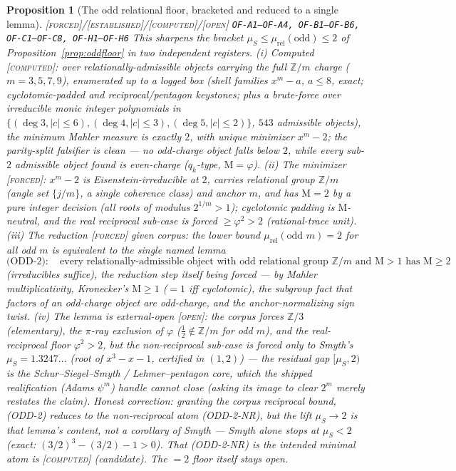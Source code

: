 \documentclass[11pt]{article}
\newcommand{\tagF}{\textcolor{cF}{\textsc{[forced]}}}
\newcommand{\tagC}{\textcolor{cC}{\textsc{[computed]}}}
\newcommand{\tagE}{\textcolor{cE}{\textsc{[established]}}}
\newcommand{\tagO}{\textcolor{cO}{\textsc{[open]}}}
\newcommand{\hx}[1]{\textcolor{cC}{\footnotesize\texttt{#1}}}
\newcommand{\Z}{\mathbb{Z}}
\newcommand{\gp}{\varphi}
\newcommand{\M}{\mathrm{M}}
\theoremstyle{plain}
\newtheorem{proposition}[theorem]{Proposition}
\theoremstyle{definition}
\theoremstyle{remark}
\begin{document}
\begin{proposition}[The odd relational floor, bracketed and reduced to a single lemma]\label{prop:oddfloorred}\tagF{}/\tagE{}/\tagC{}/\tagO{} \hx{OF-A1--OF-A4, OF-B1--OF-B6, OF-C1--OF-C8, OF-H1--OF-H6}
This sharpens the bracket $\mu_S\le\mu_{\mathrm{rel}}(\text{odd})\le2$ of
Proposition~\ref{prop:oddfloor} in two independent registers.
\emph{(i) Computed} \tagC{}: over relationally-admissible objects carrying the
full $\Z/m$ charge ($m=3,5,7,9$), enumerated up to a \emph{logged} box (shell
families $x^m-a$, $a\le8$, exact; cyclotomic-padded and reciprocal/pentagon
keystones; plus a brute-force over irreducible monic integer polynomials in
$\{(\deg3,|c|\le6),(\deg4,|c|\le3),(\deg5,|c|\le2)\}$, $543$ admissible objects),
the minimum Mahler measure is \emph{exactly} $2$, with unique minimizer $x^m-2$;
the parity-split falsifier is clean --- no odd-charge object falls below $2$,
while every sub-$2$ admissible object found is even-charge ($q_k$-type,
$\M=\gp$). \emph{(ii) The minimizer} \tagF{}: $x^m-2$ is Eisenstein-irreducible
at $2$, carries relational group $\Z/m$ (angle set $\{j/m\}$, a single coherence
class) and anchor $m$, and has $\M=2$ by a pure integer decision (all roots of
modulus $2^{1/m}>1$); cyclotomic padding is $\M$-neutral, and the real reciprocal
sub-case is forced $\ge\gp^2>2$ (rational-trace unit). \emph{(iii) The reduction}
\tagF{}\emph{ given corpus}: the lower bound $\mu_{\mathrm{rel}}(\text{odd }m)=2$
for \emph{all} odd $m$ is \emph{equivalent} to the single named lemma
\[
\text{(ODD-2)}\colon\quad\text{every relationally-admissible object with odd
relational group }\Z/m\text{ and }\M>1\text{ has }\M\ge2
\]
(irreducibles suffice), the reduction step itself being forced --- by Mahler
multiplicativity, Kronecker's $\M\ge1$ (${=}1$ iff cyclotomic), the subgroup fact
that factors of an odd-charge object are odd-charge, and the anchor-normalizing
sign twist. \emph{(iv) The lemma is external-open} \tagO{}: the corpus forces
$\Z/3$ (elementary), the $\pi$-ray exclusion of $\gp$ ($\tfrac12\notin\Z/m$ for
odd $m$), and the real-reciprocal floor $\gp^2>2$, but the non-reciprocal
sub-case is forced only to Smyth's $\mu_S=1.3247\ldots$ (root of $x^3-x-1$,
certified in $(1,2)$) --- the residual gap $[\mu_S,2)$ is the
Schur--Siegel--Smyth / Lehmer--pentagon core, which the shipped realification
(Adams $\psi^m$) handle cannot close (asking its image to clear $2^m$ merely
restates the claim). \emph{Honest correction:} granting the corpus reciprocal
bound, (ODD-2) reduces to the non-reciprocal atom (ODD-2-NR), but the lift
$\mu_S\to2$ \emph{is} that lemma's content, \emph{not} a corollary of Smyth ---
Smyth alone stops at $\mu_S<2$ (exact: $(3/2)^3-(3/2)-1>0$). That (ODD-2-NR) is
the intended minimal atom is \tagC{} (candidate). The $=2$ floor itself stays
open.
\end{proposition}
\end{document}

